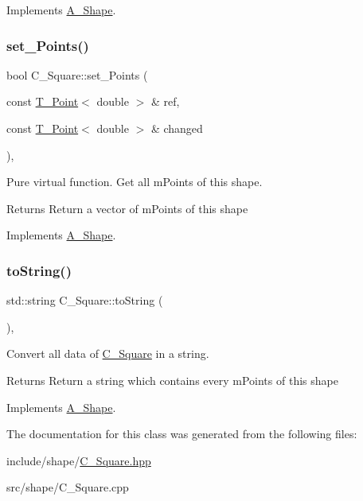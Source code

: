 Implements \hyperlink{classShape_a2dea8616fd40f2d69fd208715921982a}{A_Shape}.

\mbox{\label{classSquare_ac474644483fa85f7a4f39969f34868fe}} 
\subsubsection{\texorpdfstring{set\+\_\+\+Points()}{set\_Points()}}
{\footnotesize\ttfamily bool C_Square\+::set\+\_\+\+Points (\begin{DoxyParamCaption}\item[{const \hyperlink{classPoint}{T_Point}$<$ double $>$ \&}]{ref,  }\item[{const \hyperlink{classPoint}{T_Point}$<$ double $>$ \&}]{changed }\end{DoxyParamCaption})\hspace{0.3cm}{\ttfamily [override]}, {\ttfamily [virtual]}}



Pure virtual function. Get all mPoints of this shape.

\begin{DoxyReturn}{Returns}
Return a vector of mPoints of this shape
\end{DoxyReturn}


Implements \hyperlink{classShape_a6eb0d80cccc44cb72b06c61d9780bc6b}{A_Shape}.

\mbox{\label{classSquare_aa5d7db8004bba3c400f57513d93b21d4}} 
\subsubsection{\texorpdfstring{to\+String()}{aToString()}}
{\footnotesize\ttfamily std\+::string C_Square\+::to\+String (\begin{DoxyParamCaption}{ }\end{DoxyParamCaption})\hspace{0.3cm}{\ttfamily [override]}, {\ttfamily [virtual]}}



Convert all data of \hyperlink{classSquare}{C_Square} in a string.

\begin{DoxyReturn}{Returns}
Return a string which contains every mPoints of this shape
\end{DoxyReturn}


Implements \hyperlink{classShape_a98fa87c6dc4c7045fd6897a8f3bc186c}{A_Shape}.



The documentation for this class was generated from the following files\+:\begin{DoxyCompactItemize}
\item 
include/shape/\hyperlink{Square_8hpp}{C_Square.\+hpp}\item
src/shape/C_Square.\+cpp\end{DoxyCompactItemize}

